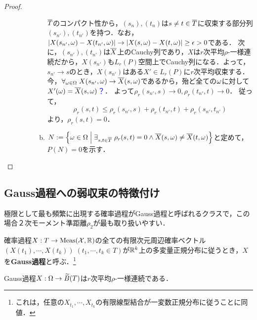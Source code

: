 \documentclass[uplatex,dvipdfmx]{jsreport}
\begin{document}
\begin{proof}
\begin{enumerate}
\begin{description}
\begin{enumerate}[(a)]
                $\overline{T}$のコンパクト性から，$(s_n),(t_n)$は$s\ne t\in\overline{T}$に収束する部分列$(s_{n'}),(t_{n'})$を持つ．なお，$\lvert X(s_{n'},\omega)-X(t_{n'},\omega)\rvert\to\lvert X(s,\omega)-X(t,\omega)\rvert\ge\epsilon>0$である．
                次に，$(s_{n'}),(t_{n'})$は$\overline{X}$上のCauchy列であり，$X$は$r$次平均$\rho$-一様連続だから，$X(s_{n'})$も$L_r(P)$空間上でCauchy列になる．よって，$s_{n'}\to s$のとき，$X(s_{n'})$はある$X'\in L_r(P)$に$r$次平均収束する．
                今，$\forall_{\omega\in\Omega}\;X(s_{n'},\omega)\to\overline{X}(s,\omega)$であるから，殆ど全ての$\omega$に対して$X'(\omega)=\overline{X}(s,\omega)$\textcolor{blue}{？}．
                よって$\rho_r(s_{n'},s)\to 0,\rho_r(t_{n'},t)\to 0$．
                従って，
                \[\rho_r(s,t)\le\rho_r(s_{n'},s)+\rho_r(t_{n'},t)+\rho_r(s_{n'},t_{n'})\]
                より，$\rho_r(s,t)=0$．
                \item $N:=\left\{\omega\in\Omega\;\middle|\;\exists_{s,t\in\overline{T}}\;\rho_r(s,t)=0\land \overline{X}(s,\omega)\ne\overline{X}(t,\omega)\right\}$と定めて，$P(N)=0$を示す．
                
            \end{enumerate}
        \end{description}
    \end{enumerate}
\end{proof}

\subsection{Gauss過程への弱収束の特徴付け}

\begin{tcolorbox}[colframe=ForestGreen, colback=ForestGreen!10!white,breakable,colbacktitle=ForestGreen!40!white,coltitle=black,fonttitle=\bfseries\sffamily,
title=]
    極限として最も頻繁に出現する確率過程がGauss過程と呼ばれるクラスで，この場合２次モーメント準距離$\rho_2$が最も取り扱いやすい．
\end{tcolorbox}

\begin{definition}\label{def-Gaussian-process}
    確率過程$X:T\to\mathrm{Meas}(\mathcal{X},\mathbb{R})$の全ての有限次元周辺確率ベクトル$(X(t_1),\cdots,X(t_k))\;(t_1,\cdots,t_k\in T)$が$\mathbb{R}^k$上の多変量正規分布に従うとき，$X$を\textbf{Gauss過程}と呼ぶ．\footnote{これは，任意の$X_{t_1},\cdots,X_{t_k}$の有限線型結合が一変数正規分布に従うことに同値．}
\end{definition}

\begin{lemma}\label{lemma-Gauss-process-is-continuous}
    Gauss過程$X:\Omega\to\widetilde{B}(T)$は$r$次平均$\rho$-一様連続である．
\end{lemma}
\end{document}
